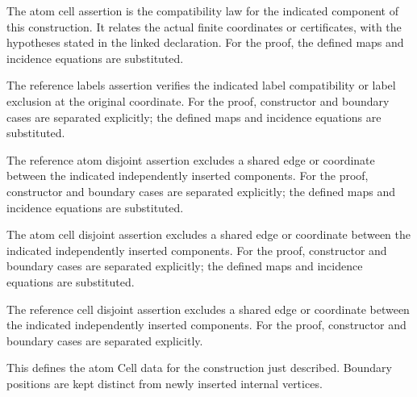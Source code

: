 The atom cell assertion is the compatibility law for the indicated component of this construction. It relates the actual finite coordinates or certificates, with the hypotheses stated in the linked declaration.
For the proof, the defined maps and incidence equations are substituted.
\par{}

The reference labels assertion verifies the indicated label compatibility or label exclusion at the original coordinate.
For the proof, constructor and boundary cases are separated explicitly; the defined maps and incidence equations are substituted.
\par{}

The reference atom disjoint assertion excludes a shared edge or coordinate between the indicated independently inserted components.
For the proof, constructor and boundary cases are separated explicitly; the defined maps and incidence equations are substituted.
\par{}

The atom cell disjoint assertion excludes a shared edge or coordinate between the indicated independently inserted components.
For the proof, constructor and boundary cases are separated explicitly; the defined maps and incidence equations are substituted.
\par{}

The reference cell disjoint assertion excludes a shared edge or coordinate between the indicated independently inserted components.
For the proof, constructor and boundary cases are separated explicitly.
\par{}

This defines the atom Cell data for the construction just described. Boundary positions are kept distinct from newly inserted internal vertices.
\par{}

